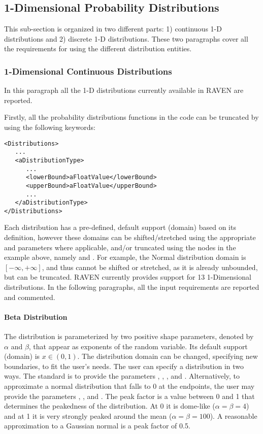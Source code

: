 \subsection{1-Dimensional Probability Distributions}
\label{subsec:1dDist}
This sub-section is organized in two different parts: 1) continuous 1-D
distributions and 2) discrete 1-D distributions.
%
These two paragraphs cover all the requirements for using the different
distribution entities.
%
\subsubsection{1-Dimensional Continuous Distributions}
\label{subsubsec:1DContinuous}
In this paragraph all the 1-D distributions currently available in RAVEN are
reported.

Firstly, all the probability distributions functions in the code can be
truncated by using the following keywords:
\begin{lstlisting}[style=XML]
<Distributions>
   ...
   <aDistributionType>
      ...
      <lowerBound>aFloatValue</lowerBound>
      <upperBound>aFloatValue</upperBound>
      ...
   </aDistributionType>
</Distributions>
\end{lstlisting}
Each distribution has a pre-defined, default support (domain) based on its
definition, however these domains can be shifted/stretched using the appropriate
 and  parameters where applicable, and/or truncated
using the nodes in the example above, namely  and
.
For example, the Normal distribution domain is $[-\infty,+\infty]$, and thus
cannot be shifted or stretched, as it is already unbounded, but can be
truncated.
%
RAVEN currently provides support for 13 1-Dimensional distributions.
%
In the following paragraphs, all the input requirements are reported and
commented.

\paragraph{Beta Distribution}
\label{Beta}
The  distribution is parameterized by two positive shape parameters, denoted by
$\alpha$ and $\beta$, that appear as exponents of the random variable. Its default support
(domain) is $x \in (0, 1)$.
%
The distribution domain can be changed, specifying new boundaries, to fit the user's needs.
%
The user can specify a  distribution in two ways.  The standard
is to provide the parameters , , ,
and .  Alternatively, to approximate a normal
distribution that falls to 0 at the endpoints, the user may provide
the parameters , , and . The
peak factor is a value between 0 and 1 that determines the peakedness of the
distribution.  At 0 it is dome-like ($\alpha=\beta=4$) and at 1 it is very
strongly peaked around the mean ($\alpha=\beta=100$).  A reasonable approximation
to a Gaussian normal is a peak factor of 0.5.

